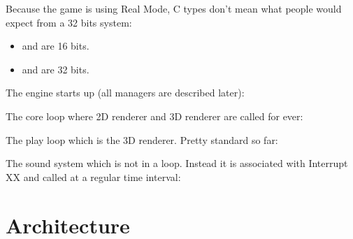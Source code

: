 \documentclass[book.tex]{subfiles}
\begin{document}
 Because the game is using Real Mode, C types don't mean what people would expect from a 32 bits system: 
\begin{itemize}
\item {} and  are 16 bits.
\item {} and  are 32 bits.
\end{itemize}
\par
The engine starts up (all managers are described later):\\
\par
\begin{minipage}{\textwidth}

\end{minipage}
\par
The core loop where 2D renderer and 3D renderer are called for ever:\\
\par
\begin{minipage}{\textwidth}

\end{minipage}
\par
The play loop which is the 3D renderer. Pretty standard so far:\\
\par
\begin{minipage}{\textwidth}

\end{minipage}
\par
The sound system which is not in a loop. Instead it is associated with Interrupt XX and called at a regular time interval:\\
\par
\begin{minipage}{\textwidth}

\end{minipage}
\par

















\section{Architecture}
\end{document}
